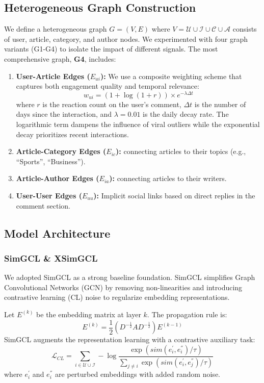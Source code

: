 \documentclass[11pt]{article}
\begin{document}
\subsection{Heterogeneous Graph Construction}
We define a heterogeneous graph $G = (V, E)$ where $V = \mathcal{U} \cup \mathcal{I} \cup \mathcal{C} \cup \mathcal{A}$ consists of user, article, category, and author nodes.
We experimented with four graph variants (G1-G4) to isolate the impact of different signals. The most comprehensive graph, \textbf{G4}, includes:
\begin{enumerate}
    \item \textbf{User-Article Edges ($E_{ui}$):} We use a composite weighting scheme that captures both engagement quality and temporal relevance:
          \begin{equation}
              w_{ui} = (1 + \log(1 + r)) \times e^{-\lambda \Delta t}
          \end{equation}
          where $r$ is the reaction count on the user's comment, $\Delta t$ is the number of days since the interaction, and $\lambda = 0.01$ is the daily decay rate. The logarithmic term dampens the influence of viral outliers while the exponential decay prioritizes recent interactions.
    \item \textbf{Article-Category Edges ($E_{ic}$):} connecting articles to their topics (e.g., ``Sports'', ``Business'').
    \item \textbf{Article-Author Edges ($E_{ia}$):} connecting articles to their writers.
    \item \textbf{User-User Edges ($E_{uu}$):} Implicit social links based on direct replies in the comment section.
\end{enumerate}

\subsection{Model Architecture}

\subsubsection{SimGCL \& XSimGCL}
We adopted SimGCL \citet{yu2022graph} as a strong baseline foundation. SimGCL simplifies Graph Convolutional Networks (GCN) by removing non-linearities and introducing contrastive learning (CL) noise to regularize embedding representations.

Let $E^{(k)}$ be the embedding matrix at layer $k$. The propagation rule is:
\begin{equation}
    E^{(k)} = \frac{1}{2} (D^{-\frac{1}{2}} A D^{-\frac{1}{2}}) E^{(k-1)}
\end{equation}
SimGCL augments the representation learning with a contrastive auxiliary task:
\begin{equation}
    \mathcal{L}_{CL} = \sum_{i \in \mathcal{U} \cup \mathcal{I}} - \log \frac{\exp(sim(e_i^{'}, e_i^{''}) / \tau)}{\sum_{j \neq i} \exp(sim(e_i^{'}, e_j^{''}) / \tau)}
\end{equation}
where $e_i^{'}$ and $e_i^{''}$ are perturbed embeddings with added random noise.
\end{document}
